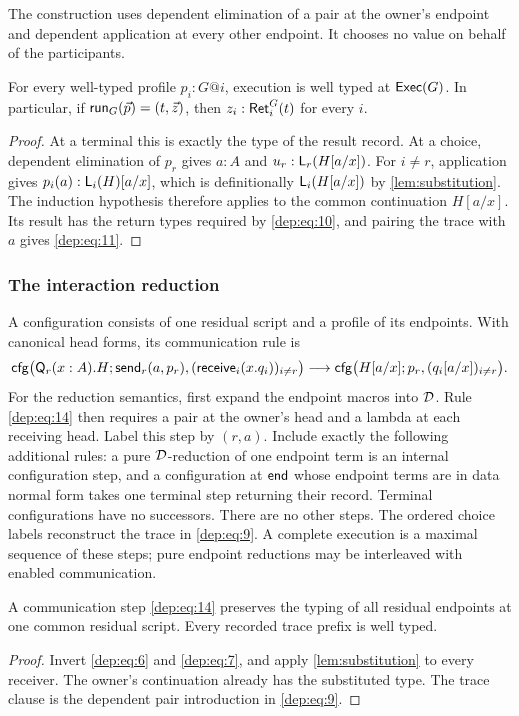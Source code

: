 The construction uses dependent elimination of a pair at the owner's endpoint
and dependent application at every other endpoint. It chooses no value on
behalf of the participants.

\begin{lemma}
\label{thm:interaction}
For every well-typed profile $p_i:G@i$, execution is well typed at $\mathsf{Exec}(G)$.
In particular, if $\mathsf{run}_G(\vec p)=(t,\vec z)$, then
$z_i:\mathsf{Ret}_i^G(t)$ for every $i$.
\end{lemma}
\begin{proof}
At a terminal this is exactly the type of the result record. At a choice,
dependent elimination of $p_r$ gives $a:A$ and $u_r:\mathsf L_{r}(H[a/x])$.
For $i\ne r$, application gives
$p_i(a):\mathsf L_{i}(H)[a/x]$, which is definitionally
$\mathsf L_{i}(H[a/x])$ by \cref{lem:substitution}.
The induction hypothesis therefore applies to the common continuation
$H[a/x]$. Its result has the return types required by \eqref{dep:eq:10}, and pairing the
trace with $a$ gives \eqref{dep:eq:11}.
\end{proof}

\subsubsection{The interaction reduction}

A configuration consists of one residual script and a profile of its
endpoints. With canonical head forms, its communication rule is
\begin{equation}
 \mathsf{cfg}\bigl(\mathsf Q_r(x:A).H;
       \mathsf{send}_r(a,p_r),(\mathsf{receive}_i(x.q_i))_{i\ne r}\bigr)
 \longrightarrow
 \mathsf{cfg}\bigl(H[a/x];p_r,(q_i[a/x])_{i\ne r}\bigr).
 \label{dep:eq:14}
\end{equation}
For the reduction semantics, first expand the endpoint macros into $\mathcal D$.
Rule \eqref{dep:eq:14} then requires a pair at the owner's head and a lambda at each
receiving head. Label this step by $(r,a)$. Include exactly the following
additional rules: a pure $\mathcal D$-reduction of one endpoint term is an internal
configuration step, and a configuration at $\mathsf{end}$ whose endpoint terms are
in data normal form takes one terminal step returning their record.
Terminal configurations have no successors. There are no other steps.
The ordered choice labels reconstruct the trace in \eqref{dep:eq:9}. A complete execution
is a maximal sequence of these steps; pure endpoint reductions may be
interleaved with enabled communication.

\begin{corollary}
\label{cor:preservation}
A communication step \eqref{dep:eq:14} preserves the typing of all residual endpoints at
one common residual script. Every recorded trace prefix is well typed.
\end{corollary}
\begin{proof}
Invert \eqref{dep:eq:6} and \eqref{dep:eq:7}, and apply \cref{lem:substitution} to every receiver. The
owner's continuation already has the substituted type. The trace clause is
the dependent pair introduction in \eqref{dep:eq:9}.
\end{proof}

